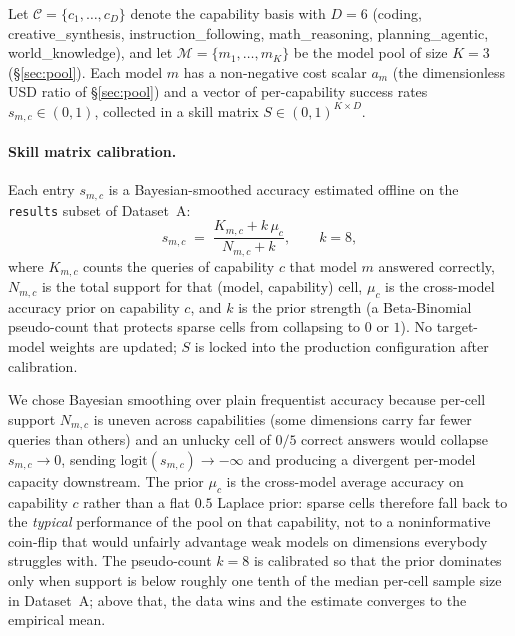 \documentclass[twocolumn,10pt,a4paper]{article}
\begin{document}
Let $\mathcal{C}{=}\{c_1,\dots,c_D\}$ denote the capability basis with $D{=}6$ (coding, creative\_synthesis, instruction\_following, math\_reasoning, planning\_agentic, world\_knowledge), and let $\mathcal{M}{=}\{m_1,\dots,m_K\}$ be the model pool of size $K{=}3$ (§\ref{sec:pool}). Each model $m$ has a non-negative cost scalar $a_m$ (the dimensionless USD ratio of §\ref{sec:pool}) and a vector of per-capability success rates $s_{m,c}\in(0,1)$, collected in a skill matrix $S\in(0,1)^{K\times D}$.

\paragraph{Skill matrix calibration.} Each entry $s_{m,c}$ is a Bayesian-smoothed accuracy estimated offline on the \texttt{results} subset of Dataset~A:
\[
  s_{m,c} \;=\; \frac{K_{m,c} + k\,\mu_c}{N_{m,c} + k}, \qquad k = 8,
\]
where $K_{m,c}$ counts the queries of capability $c$ that model $m$ answered correctly, $N_{m,c}$ is the total support for that (model, capability) cell, $\mu_c$ is the cross-model accuracy prior on capability $c$, and $k$ is the prior strength (a Beta-Binomial pseudo-count that protects sparse cells from collapsing to $0$ or $1$). No target-model weights are updated; $S$ is locked into the production configuration after calibration.

We chose Bayesian smoothing over plain frequentist accuracy because per-cell support $N_{m,c}$ is uneven across capabilities (some dimensions carry far fewer queries than others) and an unlucky cell of $0/5$ correct answers would collapse $s_{m,c}{\to}0$, sending $\mathrm{logit}(s_{m,c}){\to}{-}\infty$ and producing a divergent per-model capacity downstream. The prior $\mu_c$ is the cross-model average accuracy on capability $c$ rather than a flat $0.5$ Laplace prior: sparse cells therefore fall back to the \emph{typical} performance of the pool on that capability, not to a noninformative coin-flip that would unfairly advantage weak models on dimensions everybody struggles with. The pseudo-count $k{=}8$ is calibrated so that the prior dominates only when support is below roughly one tenth of the median per-cell sample size in Dataset~A; above that, the data wins and the estimate converges to the empirical mean.
\end{document}
